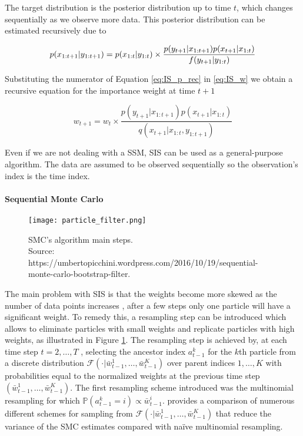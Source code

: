 The target distribution is the posterior distribution up to time $t$, which changes sequentially as we observe more data. This posterior distribution can be estimated recursively due to

\begin{equation} \label{eq:IS_p_rec}
p(x_{1:t+1}|y_{1:t+1}) = p(x_{1:t}|y_{1:t}) \times \frac{p(y_{t+1}|x_{1:t+1})p(x_{t+1}|x_{1:t})}{f(y_{t+1}|y_{1:t})} \\
\end{equation}

Substituting the numerator of Equation \ref{eq:IS_p_rec} in \ref{eq:IS_w} we obtain a recursive equation for the importance weight at time $t+1$

$$ w_{t+1} = w_{t} \times \frac{p(y_{t+1}|x_{1:t+1})p(x_{t+1}|x_{1:t})}{q(x_{t+1}|x_{1:t},y_{1:t+1})} $$


Even if we are not dealing with a \gls{SSM}, \gls{SIS} can be used as a general-purpose algorithm. The data are assumed to be observed sequentially so the observation’s index is the time index.


\paragraph{Sequential Monte Carlo} \label{SMC}

\begin{figure}[h!]
\centering
    \texttt{[image: particle\_filter.png]} 
    \caption{\acrlong{SMC}'s algorithm main steps. \\ Source: https://umbertopicchini.wordpress.com/2016/10/19/sequential-monte-carlo-bootstrap-filter.}
    \label{fig:smc} 
\end{figure}

The main problem with \gls{SIS} is that the weights become more skewed as the number of data points increases \cite{Anonymous:2001ue}, after a few steps only one particle will have a significant weight. To remedy this, a resampling step can be introduced which allows to eliminate particles with small weights and replicate particles with high weights, as illustrated in Figure \ref{fig:smc}.
The resampling step is achieved by, at each time step $t = 2, \dots , T$ ,
selecting the ancestor index $a^k_{t-1}$ for the $k$th particle from a discrete distribution 
$\mathcal{F} (\cdot|\bar{w}^1_{t-1},\dots, \bar{w}^K_{t-1})$
over parent indices ${1, \dots , K }$ with probabilities equal to the normalized weights at the previous time step $(\bar{w}^1_{t-1},\dots, \bar{w}^K_{t-1})$. The first resampling scheme introduced was the multinomial resampling for which $\mathbb{P}(a^k_{t-1} = i) \propto \bar{w}^i_{t-1}$. \cite{Douc:2005wa} provides a comparison of numerous different schemes for sampling from $\mathcal{F} (\cdot|\bar{w}^1_{t-1},\dots, \bar{w}^K_{t-1})$ that reduce the variance of the \gls{SMC} estimates compared with naïve multinomial resampling.

